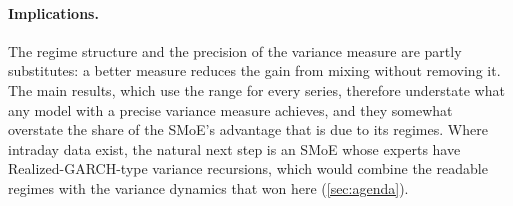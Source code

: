 \paragraph{Implications.} The regime structure and the precision of the variance measure are partly
substitutes: a better measure reduces the gain from mixing without removing it. The main results,
which use the range for every series, therefore understate what any model with a precise variance
measure achieves, and they somewhat overstate the share of the SMoE's advantage that is due to its
regimes. Where intraday data exist, the natural next step is an SMoE whose
experts have Realized-GARCH-type variance recursions, which would combine the readable regimes with
the variance dynamics that won here (\cref{sec:agenda}).
